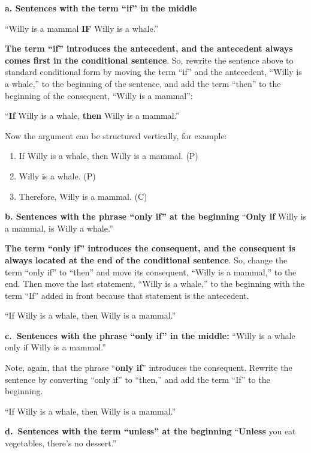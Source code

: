 \documentclass[
]{book}
\providecommand{\tightlist}{%
  \setlength{\itemsep}{0pt}\setlength{\parskip}{0pt}}
\begin{document}
\textbf{a. Sentences with the term ``if'' in the middle}

``Willy is a mammal \textbf{IF} Willy is a whale.''

\textbf{The term ``if'' introduces the antecedent, and the antecedent always comes first in the conditional sentence}. So, rewrite the sentence above to standard conditional form by moving the term ``if'' and the antecedent, ``Willy is a whale,'' to the beginning of the sentence, and add the term ``then'' to the beginning of the consequent, ``Willy is a mammal'':

``\textbf{If} Willy is a whale, \textbf{then} Willy is a mammal.''

Now the argument can be structured vertically, for example:

\begin{enumerate}
\def\labelenumi{\arabic{enumi}.}
\tightlist
\item
  If Willy is a whale, then Willy is a mammal. (P)\\
\item
  Willy is a whale. (P)\\
\item
  Therefore, Willy is a mammal. (C)
\end{enumerate}

\textbf{b. Sentences with the phrase ``only if'' at the beginning}
``\textbf{Only if} Willy is a mammal, is Willy a whale.''

\textbf{The term ``only if'' introduces the consequent, and the consequent is always located at the end of the conditional sentence}. So, change the term ``only if'' to ``then'' and move its consequent, ``Willy is a mammal,'' to the end. Then move the last statement, ``Willy is a whale,'' to the beginning with the term ``If'' added in front because that statement is the antecedent.

``If Willy is a whale, then Willy is a mammal.''

\textbf{c.~Sentences with the phrase ``only if'' in the middle:}
``Willy is a whale only if Willy is a mammal.''

Note, again, that the phrase ``\textbf{only if}'' introduces the consequent. Rewrite the sentence by converting ``only if'' to ``then,'' and add the term ``If'' to the beginning.

``If Willy is a whale, then Willy is a mammal.''

\textbf{d.~Sentences with the term ``unless'' at the beginning}
``\textbf{Unless} you eat vegetables, there's no dessert.''
\end{document}
